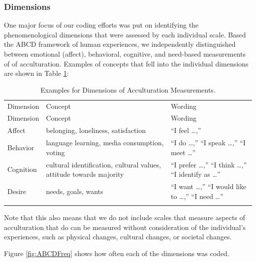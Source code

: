 \documentclass[
  american,
  man]{apa7}
\begin{document}
\hypertarget{dimensions}{%
\subsubsection{Dimensions}\label{dimensions}}

One major focus of our coding efforts was put on identifying the phenomenological dimensions that were assessed by each individual scale. Based the ABCD framework of human experiences, we independently distinguished between emotional (affect), behavioral, cognitive, and need-based measurements of of acculturation. Examples of concepts that fell into the individual dimensions are shown in Table \ref{tab:Dimensions}:\\

\begin{longtable}[]{@{}
  >{\raggedright\arraybackslash}p{}
  >{\raggedright\arraybackslash}p{}
  >{\raggedright\arraybackslash}p{}@{}}
\caption{\label{tab:Dimensions} Examples for Dimensions of Acculturation Measurements.}\tabularnewline
\toprule
Dimension & Concept & Wording \\ \addlinespace
\midrule
\endfirsthead
\toprule
Dimension & Concept & Wording \\ \addlinespace
\midrule
\endhead
Affect & belonging, loneliness, satisfaction & ``I feel \ldots{},'' \\ \addlinespace
Behavior & language learning, media consumption, voting & ``I do \ldots{},'' ``I speak \ldots{},'' ``I meet \ldots{}'' \\ \addlinespace
Cognition & cultural identification, cultural values, attitude towards majority & ``I prefer \ldots{},'' ``I think \ldots{},'' ``I identify as \ldots{}'' \\ \addlinespace
Desire & needs, goals, wants & ``I want \ldots{},'' ``I would like to \ldots{},'' ``I need \ldots{}'' \\ \addlinespace
\bottomrule
\end{longtable}

Note that this also means that we do not include scales that measure aspects of acculturation that do can be measured without consideration of the individual's experiences, such as physical changes, cultural changes, or societal changes.

Figure \ref{fig:ABCDFreq} shows how often each of the dimensions was coded.
\end{document}
